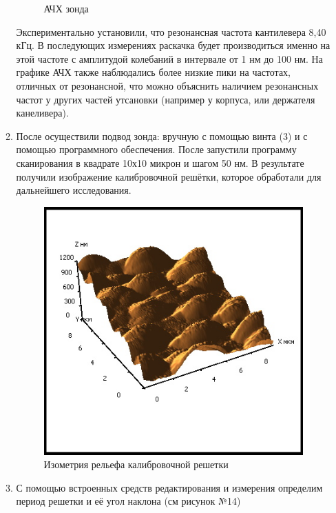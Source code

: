 \documentclass[a4paper,12pt]{article}
\theoremstyle{plain} %
\theoremstyle{definition} %
\theoremstyle{remark} %
\begin{document}
\begin{itemize}
\begin{enumerate}
\begin{figure}[H]
		\caption{АЧХ зонда}
		\label{pic13}
	\end{figure}
	Экспериментально установили, что резонансная частота кантилевера 8,40 кГц. В последующих измерениях раскачка будет производиться именно на этой частоте с амплитудой колебаний в интервале от 1 нм до 100 нм. На графике АЧХ также наблюдались более низкие пики на частотах, отличных от резонансной, что можно объяснить наличием резонансных частот у других частей утсановки (например у корпуса, или держателя канеливера).
	\item
	После осуществили подвод зонда: вручную с помощью винта (3) и с помощью программного обеспечения. После запустили программу сканирования в квадрате 10х10 микрон и шагом 50 нм. В результате получили изображение калибровочной решётки, которое обработали для дальнейшего исследования.
	\begin{figure}[H]
		\centering
		\includegraphics[scale=0.9]{pic100.jpg}
		\caption{Изометрия рельефа калибровочной решетки}
		\label{pic100}
	\end{figure}
	\item
	С помощью встроенных средств редактирования и измерения определим период решетки и её угол наклона (см рисунок №14)


\end{enumerate}
\end{itemize}
\end{document}
